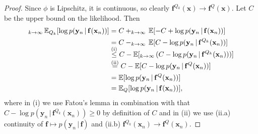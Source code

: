 \documentclass[twoside]{article}
\newcommand{\vf}{\mathbf{f}}
\newcommand{\vs}{\mathbf{s}}
\newcommand{\vx}{\mathbf{x}}
\newcommand{\vy}{\mathbf{y}}
\newcommand{\vmu}{\bm{\upmu}}
\newcommand{\vsigma}{\bm{\upsigma}}
\newcommand{\E}{\mathbb{E}}
\newcommand{\Q}{\mathbb{Q}}
\renewcommand{\Q}{\ensuremath{Q}}
\newcommand{\R}{\mathbb{R}}
\newcommand{\sub}{\subseteq}
\newcommand{\opspace}{}
\let\max\relax\DeclareMathOperator*{\max}{max\opspace}
\let\limsup\relax\DeclareMathOperator*{\limsup}{lim\,sup\opspace}
\let\liminf\relax\DeclareMathOperator*{\liminf}{lim\,inf\vphantom{p}\opspace}
\newcommand{\Normal}{\mathcal{N}}
\newcommand{\cond}{\,|\,}                  %
\theoremstyle{theoremstyle}
\begin{document}
\begin{proof}
Since $\phi$ is Lipschitz, it is continuous, so clearly $\vf^{Q_k}(\vx) \to \vf^{Q}(\vx)$.
Let $C$ be the upper bound on the likelihood.
Then
\begin{align*}
    \limsup_{k \to \infty}\,\E_{Q_k}[\log p(\vy_n \cond \vf(\vx_n))]
    &= C + \limsup_{k \to \infty}\,\E[-C + \log p(\vy_n \cond \vf(\vx_n))] \\
    &= C - \liminf_{k \to \infty}\,\E[C - \log p(\vy_n \cond \vf^{Q_k}(\vx_n))] \\
    &\overset{\smash{\text{(i)}}}{\le} C - \E[\liminf_{k \to \infty}\,(C - \log p(\vy_n \cond \vf^{Q_k}(\vx_n)))] \\
    &\overset{\smash{\text{(ii)}}}{=} \vphantom{\liminf_{k \to \infty}} C - \E[C - \log p(\vy_n \cond \vf^{Q}(\vx_n))] \\
    &=\vphantom{\liminf_{k \to \infty}} \E[\log p(\vy_n \cond \vf^{Q}(\vx_n))] \\
    &= \E_{Q}[\log p(\vy_n \cond \vf(\vx_n))],
\end{align*}
where in (i) we use Fatou's lemma in combination with that $C - \log p(\vy_n \cond \vf^{Q_k}(\vx_n)) \ge 0$ by definition of $C$ and in (ii) we use (ii.a) continuity of $\vf \mapsto p(\vy_n \cond \vf)$ and (ii.b) $\vf^{Q_k}(\vx_n) \to \vf^{Q}(\vx_n)$.
%
%
%
\end{proof}
\end{document}
